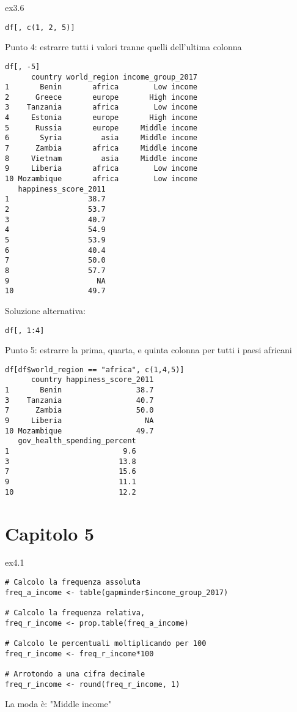 \begin{solution}{ex3.6}
\begin{lstlisting}[style=Rstyle]
df[, c(1, 2, 5)]
\end{lstlisting}
%
\noindent Punto 4: estrarre tutti i valori tranne quelli dell'ultima colonna

\begin{lstlisting}[style=Rstyle]
df[, -5]
      country world_region income_group_2017
1       Benin       africa        Low income
2      Greece       europe       High income
3    Tanzania       africa        Low income
4     Estonia       europe       High income
5      Russia       europe     Middle income
6       Syria         asia     Middle income
7      Zambia       africa     Middle income
8     Vietnam         asia     Middle income
9     Liberia       africa        Low income
10 Mozambique       africa        Low income
   happiness_score_2011
1                  38.7
2                  53.7
3                  40.7
4                  54.9
5                  53.9
6                  40.4
7                  50.0
8                  57.7
9                    NA
10                 49.7
\end{lstlisting}
%
Soluzione alternativa:

\begin{lstlisting}[style=Rstyle]
df[, 1:4]
\end{lstlisting}
%
\noindent Punto 5: estrarre la prima, quarta, e quinta colonna per tutti i paesi africani

\begin{lstlisting}[style=Rstyle]
df[df$world_region == "africa", c(1,4,5)]	
      country happiness_score_2011
1       Benin                 38.7
3    Tanzania                 40.7
7      Zambia                 50.0
9     Liberia                   NA
10 Mozambique                 49.7
   gov_health_spending_percent
1                          9.6
3                         13.8
7                         15.6
9                         11.1
10                        12.2	
\end{lstlisting}

\end{solution}

\section{Capitolo 5}


\begin{solution}{ex4.1}

\begin{lstlisting}[style=Rstylescript]
# Calcolo la frequenza assoluta
freq_a_income <- table(gapminder$income_group_2017)

# Calcolo la frequenza relativa, 
freq_r_income <- prop.table(freq_a_income)

# Calcolo le percentuali moltiplicando per 100
freq_r_income <- freq_r_income*100

# Arrotondo a una cifra decimale
freq_r_income <- round(freq_r_income, 1)
\end{lstlisting}

\noindent La moda \`e: "Middle income"

\end{solution}

